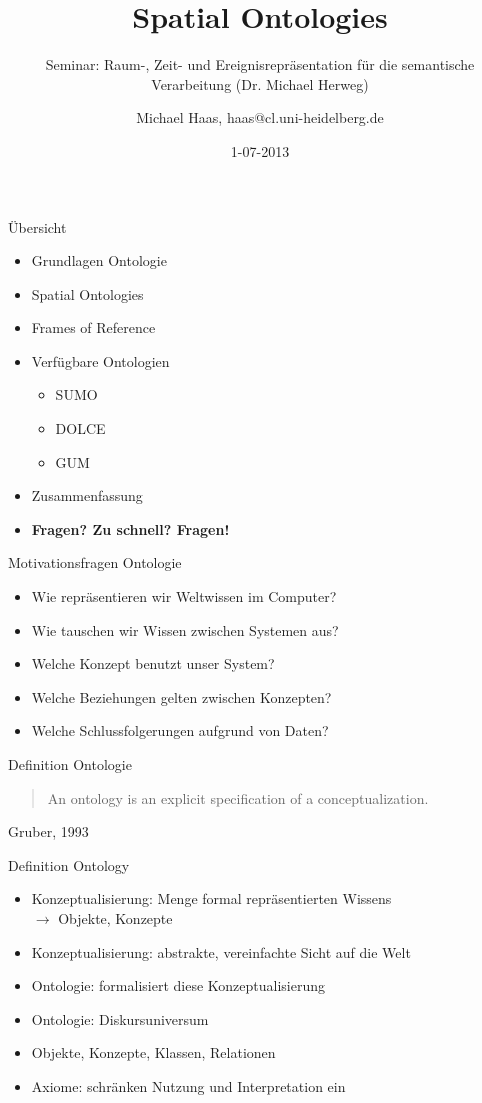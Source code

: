 \documentclass[12pt,a4paper]{beamer}
\author{Michael Haas, haas@cl.uni-heidelberg.de}
\title{Spatial Ontologies}
\subtitle{Seminar: Raum-, Zeit- und Ereignisrepräsentation für die semantische Verarbeitung (Dr. Michael Herweg)}
\date{1-07-2013}
\begin{document}
\begin{frame}
\maketitle
\end{frame}

\begin{frame}{Übersicht}
\begin{itemize}
\item Grundlagen Ontologie
\item Spatial Ontologies
\item Frames of Reference
\item Verfügbare Ontologien
\begin{itemize}
    \item SUMO
    \item DOLCE
    \item GUM
\end{itemize}
\item Zusammenfassung 
\item \textbf{Fragen? Zu schnell? Fragen!}
\end{itemize}
\end{frame}


\begin{frame}{Motivationsfragen Ontologie}
\begin{itemize}
\item Wie repräsentieren wir Weltwissen im Computer?
\item Wie tauschen wir Wissen zwischen Systemen aus?
\item Welche Konzept benutzt unser System?
\item Welche Beziehungen gelten zwischen Konzepten?
\item Welche Schlussfolgerungen aufgrund von Daten?
\end{itemize}
\end{frame}



\begin{frame}{Definition Ontologie}
\begin{quote}
An ontology is an explicit specification of a conceptualization.
\end{quote}
Gruber, 1993
\end{frame}

\begin{frame}{Definition Ontology}
\begin{itemize}
\item Konzeptualisierung: Menge formal repräsentierten Wissens \\
$\to$ Objekte, Konzepte
\item Konzeptualisierung: abstrakte, vereinfachte Sicht auf die Welt
\item Ontologie: formalisiert diese Konzeptualisierung
\item Ontologie: Diskursuniversum
\item Objekte, Konzepte, Klassen, Relationen
\item Axiome: schränken Nutzung und Interpretation ein
\end{itemize}
\end{frame}
\end{document}
